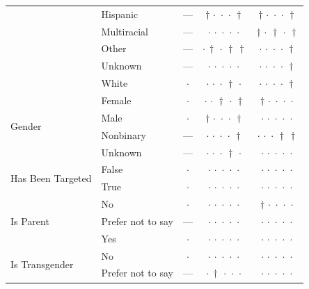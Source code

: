 {\begin{longtable}[t]{llccc}
 & Hispanic & --- & ${\dagger}\,{\cdot}\,{\cdot}\,{\cdot}\,{\dagger}$ & ${\dagger}\,{\cdot}\,{\cdot}\,{\cdot}\,{\dagger}$ \\
 & Multiracial & --- & ${\cdot}\,{\cdot}\,{\cdot}\,{\cdot}\,{\cdot}$ & ${\dagger}\,{\cdot}\,{\dagger}\,{\cdot}\,{\dagger}$ \\
 & Other & --- & ${\cdot}\,{\dagger}\,{\cdot}\,{\dagger}\,{\dagger}$ & ${\cdot}\,{\cdot}\,{\cdot}\,{\cdot}\,{\dagger}$ \\
 & Unknown & --- & ${\cdot}\,{\cdot}\,{\cdot}\,{\cdot}\,{\cdot}$ & ${\cdot}\,{\cdot}\,{\cdot}\,{\cdot}\,{\dagger}$ \\
 & White & $\cdot$ & ${\cdot}\,{\cdot}\,{\cdot}\,{\dagger}\,{\cdot}$ & ${\cdot}\,{\cdot}\,{\cdot}\,{\cdot}\,{\dagger}$ \\
\cline{1-5}
\multirow[t]{4}{*}{Gender} & Female & $\cdot$ & ${\cdot}\,{\cdot}\,{\dagger}\,{\cdot}\,{\dagger}$ & ${\dagger}\,{\cdot}\,{\cdot}\,{\cdot}\,{\cdot}$ \\
 & Male & $\cdot$ & ${\dagger}\,{\cdot}\,{\cdot}\,{\cdot}\,{\dagger}$ & ${\cdot}\,{\cdot}\,{\cdot}\,{\cdot}\,{\cdot}$ \\
 & Nonbinary & --- & ${\cdot}\,{\cdot}\,{\cdot}\,{\cdot}\,{\dagger}$ & ${\cdot}\,{\cdot}\,{\cdot}\,{\dagger}\,{\dagger}$ \\
 & Unknown & --- & ${\cdot}\,{\cdot}\,{\cdot}\,{\dagger}\,{\cdot}$ & ${\cdot}\,{\cdot}\,{\cdot}\,{\cdot}\,{\cdot}$ \\
\cline{1-5}
\multirow[t]{2}{*}{Has Been Targeted} & False & $\cdot$ & ${\cdot}\,{\cdot}\,{\cdot}\,{\cdot}\,{\cdot}$ & ${\cdot}\,{\cdot}\,{\cdot}\,{\cdot}\,{\cdot}$ \\
 & True & $\cdot$ & ${\cdot}\,{\cdot}\,{\cdot}\,{\cdot}\,{\cdot}$ & ${\cdot}\,{\cdot}\,{\cdot}\,{\cdot}\,{\cdot}$ \\
\cline{1-5}
\multirow[t]{3}{*}{Is Parent} & No & $\cdot$ & ${\cdot}\,{\cdot}\,{\cdot}\,{\cdot}\,{\cdot}$ & ${\dagger}\,{\cdot}\,{\cdot}\,{\cdot}\,{\cdot}$ \\
 & Prefer not to say & --- & ${\cdot}\,{\cdot}\,{\cdot}\,{\cdot}\,{\cdot}$ & ${\cdot}\,{\cdot}\,{\cdot}\,{\cdot}\,{\cdot}$ \\
 & Yes & $\cdot$ & ${\cdot}\,{\cdot}\,{\cdot}\,{\cdot}\,{\cdot}$ & ${\cdot}\,{\cdot}\,{\cdot}\,{\cdot}\,{\cdot}$ \\
\cline{1-5}
\multirow[t]{3}{*}{Is Transgender} & No & $\cdot$ & ${\cdot}\,{\cdot}\,{\cdot}\,{\cdot}\,{\cdot}$ & ${\cdot}\,{\cdot}\,{\cdot}\,{\cdot}\,{\cdot}$ \\
 & Prefer not to say & --- & ${\cdot}\,{\dagger}\,{\cdot}\,{\cdot}\,{\cdot}$ & ${\cdot}\,{\cdot}\,{\cdot}\,{\cdot}\,{\cdot}$ \\

\end{longtable}}
